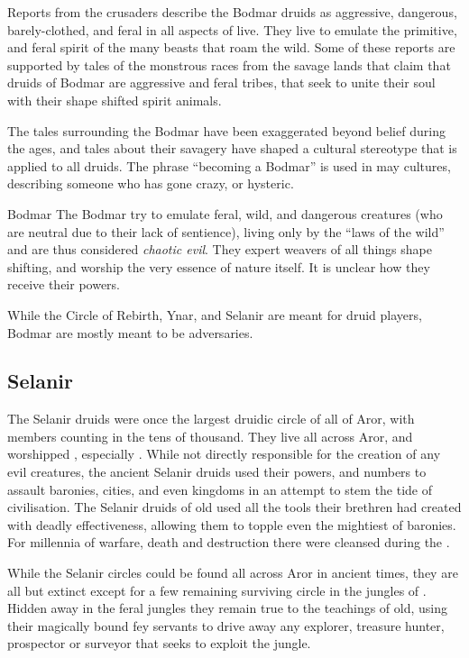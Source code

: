 Reports from the crusaders describe the Bodmar druids as aggressive,
dangerous, barely-clothed, and feral in all aspects of live. They live to
emulate the primitive, and feral spirit of the many beasts that roam the wild.
Some of these reports are supported by tales of the monstrous races from the
savage lands that claim that druids of Bodmar are aggressive and feral
tribes, that seek to unite their soul with their shape shifted spirit animals.

The tales surrounding the Bodmar have been exaggerated beyond belief during the
ages, and tales about their savagery have shaped a cultural stereotype that is
applied to all druids. The phrase ``becoming a Bodmar'' is used in may cultures,
describing someone who has gone crazy, or hysteric.

\begin{35e}{Bodmar}
  The Bodmar try to emulate feral, wild, and dangerous creatures (who are
  neutral due to their lack of sentience), living only by the ``laws of the
  wild'' and are thus considered \emph{chaotic evil}. They expert weavers of
  all things shape shifting, and worship the very essence of nature itself. It
  is unclear how they receive their powers.
\end{35e}

\begin{note}
  While the Circle of Rebirth, Ynar, and Selanir are meant for druid players,
  Bodmar are mostly meant to be adversaries.
\end{note}

\subsection{Selanir}
\label{sec:Selanir}

The Selanir druids were once the largest druidic circle of all of Aror, with
members counting in the tens of thousand. They live all across Aror, and
worshipped , especially . While not
directly responsible for the creation of any evil creatures, the ancient
Selanir druids used their powers, and numbers to assault baronies, cities, and
even kingdoms in an attempt to stem the tide of civilisation. The Selanir
druids of old used all the tools their brethren had created with deadly
effectiveness, allowing them to topple even the mightiest of baronies. For
millennia of warfare, death and destruction there were cleansed during the
.

While the Selanir circles could be found all across Aror in ancient times,
they are all but extinct except for a few remaining surviving circle in
the jungles of . Hidden away in the feral jungles they
remain true to the teachings of old, using their magically bound fey servants
to drive away any explorer, treasure hunter, prospector or surveyor that
seeks to exploit the jungle.

